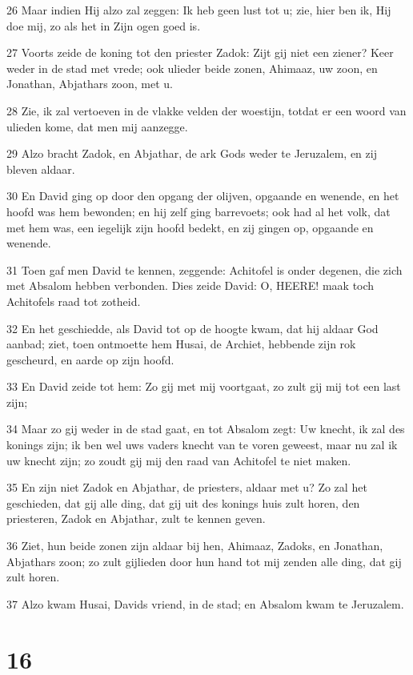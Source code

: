 \par 26 Maar indien Hij alzo zal zeggen: Ik heb geen lust tot u; zie, hier ben ik, Hij doe mij, zo als het in Zijn ogen goed is.
\par 27 Voorts zeide de koning tot den priester Zadok: Zijt gij niet een ziener? Keer weder in de stad met vrede; ook ulieder beide zonen, Ahimaaz, uw zoon, en Jonathan, Abjathars zoon, met u.
\par 28 Zie, ik zal vertoeven in de vlakke velden der woestijn, totdat er een woord van ulieden kome, dat men mij aanzegge.
\par 29 Alzo bracht Zadok, en Abjathar, de ark Gods weder te Jeruzalem, en zij bleven aldaar.
\par 30 En David ging op door den opgang der olijven, opgaande en wenende, en het hoofd was hem bewonden; en hij zelf ging barrevoets; ook had al het volk, dat met hem was, een iegelijk zijn hoofd bedekt, en zij gingen op, opgaande en wenende.
\par 31 Toen gaf men David te kennen, zeggende: Achitofel is onder degenen, die zich met Absalom hebben verbonden. Dies zeide David: O, HEERE! maak toch Achitofels raad tot zotheid.
\par 32 En het geschiedde, als David tot op de hoogte kwam, dat hij aldaar God aanbad; ziet, toen ontmoette hem Husai, de Archiet, hebbende zijn rok gescheurd, en aarde op zijn hoofd.
\par 33 En David zeide tot hem: Zo gij met mij voortgaat, zo zult gij mij tot een last zijn;
\par 34 Maar zo gij weder in de stad gaat, en tot Absalom zegt: Uw knecht, ik zal des konings zijn; ik ben wel uws vaders knecht van te voren geweest, maar nu zal ik uw knecht zijn; zo zoudt gij mij den raad van Achitofel te niet maken.
\par 35 En zijn niet Zadok en Abjathar, de priesters, aldaar met u? Zo zal het geschieden, dat gij alle ding, dat gij uit des konings huis zult horen, den priesteren, Zadok en Abjathar, zult te kennen geven.
\par 36 Ziet, hun beide zonen zijn aldaar bij hen, Ahimaaz, Zadoks, en Jonathan, Abjathars zoon; zo zult gijlieden door hun hand tot mij zenden alle ding, dat gij zult horen.
\par 37 Alzo kwam Husai, Davids vriend, in de stad; en Absalom kwam te Jeruzalem.

\chapter{16}

